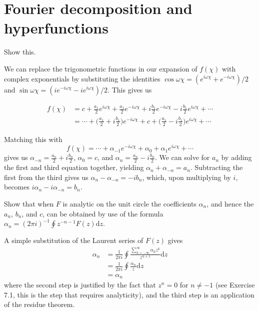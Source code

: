 \documentclass[../the-road-to-reality.tex]{subfiles}
\begin{document}
\section{Fourier decomposition and hyperfunctions}

\begin{questions}
	
\question Show this.

\begin{solution}
	We can replace the trigonometric functions in our expansion of $f(\chi)$ with complex exponentials by substituting the identities $\cos\omega\chi = (e^{i\omega\chi} + e^{-i\omega\chi})/2$ and $\sin\omega\chi = (ie^{-i\omega\chi} - ie^{i\omega\chi})/2$. This gives us
	
	\begin{align*}
		f(\chi) &= c + \frac{a_1}{2}e^{i\omega\chi} + \frac{a_1}{2}e^{-i\omega\chi} + i\frac{b_1}{2}e^{-i\omega\chi} - i\frac{b_1}{2}e^{i\omega\chi} + \cdots \\
		&= \cdots + \Big(\frac{a_1}{2} + i\frac{b_1}{2}\Big)e^{-i\omega\chi} + c + \Big(\frac{a_1}{2} - i\frac{b_1}{2}\Big)e^{i\omega\chi} + \cdots
	\end{align*}
	
	Matching this with $$f(\chi) = \cdots + \alpha_{-1}e^{-i\omega\chi} + \alpha_0 + \alpha_1e^{i\omega\chi} + \cdots$$gives us $\alpha_{-n} = \frac{a_n}{2} + i\frac{b_n}{2}$, $\alpha_0 = c$, and $\alpha_n = \frac{a_n}{2} - i\frac{b_n}{2}$. We can solve for $a_n$ by adding the first and third equation together, yielding $\alpha_n + \alpha_{-n} = a_n$. Subtracting the first from the third gives us $\alpha_n - \alpha_{-n} = -ib_n$, which, upon multiplying by $i$, becomes $i\alpha_n - i\alpha_{-n} = b_n$. 
\end{solution}

\question Show that when $F$ is analytic on the unit circle the coefficients $\alpha_n$, and hence the $a_n$, $b_n$, and $c$, can be obtained by use of the formula $\alpha_n=(2\pi{i})^{-1}\oint{z^{-n-1}}F(z)\mathrm{d}z$.

\begin{solution}
	A simple substitution of the Laurent series of $F(z)$ gives
	\begin{align*}
		\alpha_n &= \frac{1}{2\pi{i}}\oint\frac{\sum_{k=-\infty}^{\infty}\alpha_kz^k}{z^{n+1}}\mathrm{d}z \\
		&= \frac{1}{2\pi{i}}\oint\frac{\alpha_n}{z}\mathrm{d}z \\
		&= \alpha_n
	\end{align*}
	where the second step is justified by the fact that $z^n=0$ for $n \neq {-1}$ (see Exercise 7.1, this is the step that requires analyticity), and the third step is an application of the residue theorem.
\end{solution}


\end{questions}
\end{document}
